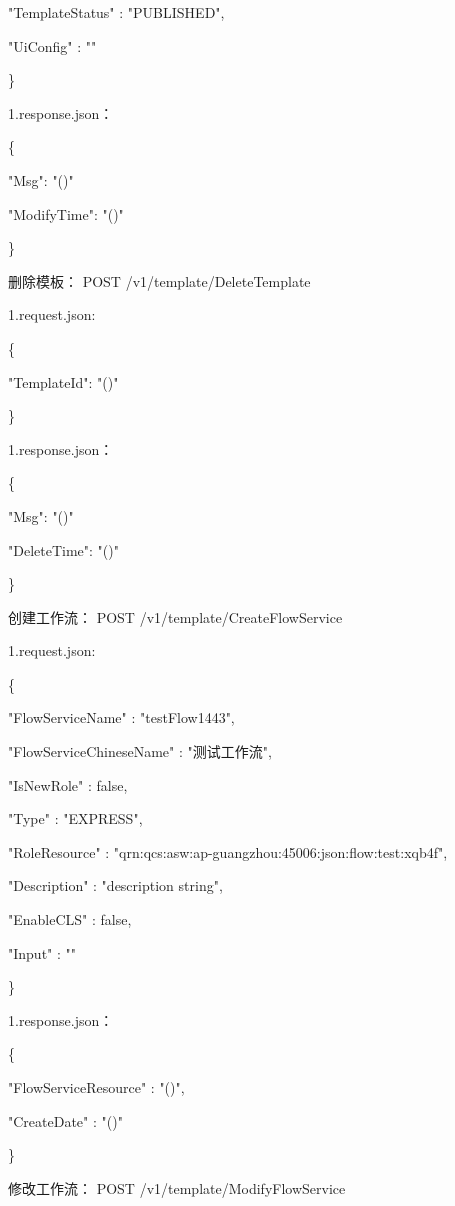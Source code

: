 "TemplateStatus"      : "PUBLISHED",

"UiConfig"            : ""

\}

1.response.json：

\{

    "Msg": "\@exists()"

    "ModifyTime": "\@exists()"

\}

删除模板：
POST /v1/template/DeleteTemplate

1.request.json:

\{

    "TemplateId": "\@exists()"

\}

1.response.json：

\{

    "Msg": "\@exists()"

    "DeleteTime": "\@exists()"

\}

创建工作流：
POST /v1/template/CreateFlowService

1.request.json:

\{

"FlowServiceName"        : "testFlow1443",

"FlowServiceChineseName" : "测试工作流",


"IsNewRole"              : false,

"Type"                   : "EXPRESS",

"RoleResource"           : "qrn:qcs:asw:ap-guangzhou:45006:json:flow:test:xqb4f",

"Description"            : "description string",

"EnableCLS"              : false,

"Input"                  : ""

\}

1.response.json：

\{

"FlowServiceResource"   : "\@exists()",

"CreateDate"            : "\@exists()"

\}


修改工作流：
POST /v1/template/ModifyFlowService

